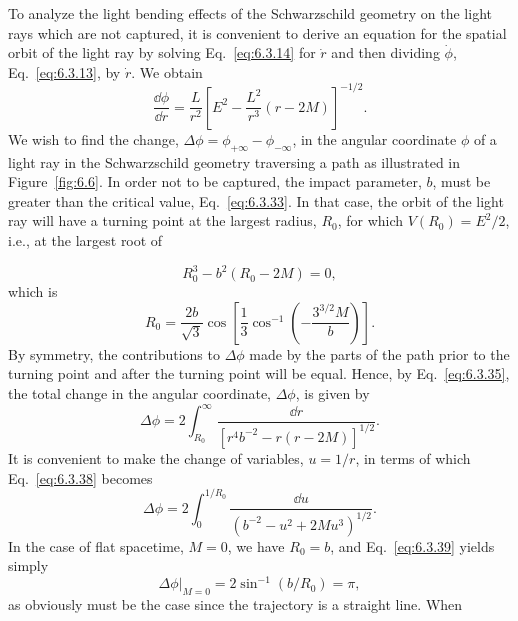 To analyze the light bending effects of the Schwarzschild geometry on the light
rays which are not captured, it is convenient to derive an equation for the
spatial orbit of the light ray by solving Eq.~\eqref{eq:6.3.14} for \(\dot r\) and
then dividing \(\dot\phi\), Eq.~\eqref{eq:6.3.13}, by \(\dot r\). We obtain
\begin{equation}
  \frac{\dd\phi}{\dd r}=\frac{L}{r^2}
  \left[E^2-\frac{L^2}{r^3}(r-2M)\right]^{-1/2}.
  \tag{6.3.35}\label{eq:6.3.35}
\end{equation}
We wish to find the change, \(\Delta\phi=\phi_{+\infty}-\phi_{-\infty}\), in the
angular coordinate \(\phi\) of a light ray in the Schwarzschild geometry
traversing a path as illustrated in Figure~\ref{fig:6.6}. In order not to be
captured, the impact parameter, \(b\), must be greater than the critical value,
Eq.~\eqref{eq:6.3.33}. In that case, the orbit of the light ray will have a
turning point at the largest radius, \(R_0\), for which \(V(R_0)=E^2/2\), i.e.,
at the largest root of

\begin{equation}
  R_0^3-b^2(R_0-2M)=0,
  \tag{6.3.36}\label{eq:6.3.36}
\end{equation}
which is
\begin{equation}
  R_0=\frac{2b}{\sqrt3}
  \cos\left[\frac13\cos^{-1}\left(-\frac{3^{3/2}M}{b}\right)\right].
  \tag{6.3.37}\label{eq:6.3.37}
\end{equation}
By symmetry, the contributions to \(\Delta\phi\) made by the parts of the path
prior to the turning point and after the turning point will be equal. Hence, by
Eq.~\eqref{eq:6.3.35}, the total change in the angular coordinate,
\(\Delta\phi\), is given by
\begin{equation}
  \Delta\phi=2\int_{R_0}^{\infty}
  \frac{\dd r}{[r^4b^{-2}-r(r-2M)]^{1/2}}.
  \tag{6.3.38}\label{eq:6.3.38}
\end{equation}
It is convenient to make the change of variables, \(u=1/r\), in terms of which
Eq.~\eqref{eq:6.3.38} becomes
\begin{equation}
  \Delta\phi=2\int_0^{1/R_0}
  \frac{\dd u}{(b^{-2}-u^2+2Mu^3)^{1/2}}.
  \tag{6.3.39}\label{eq:6.3.39}
\end{equation}
In the case of flat spacetime, \(M=0\), we have \(R_0=b\), and
Eq.~\eqref{eq:6.3.39} yields simply
\begin{equation}
  \left.\Delta\phi\right|_{M=0}=2\sin^{-1}(b/R_0)=\pi,
  \tag{6.3.40}\label{eq:6.3.40}
\end{equation}
as obviously must be the case since the trajectory is a straight line. When
